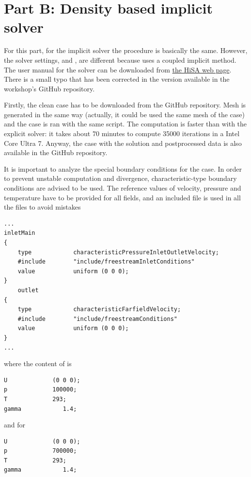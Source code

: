 \documentclass[
    parskip=half,      %
    DIV=12,            %
    headings=normal,   %
    fontsize=11pt,     %
    english            %
]{scrartcl}
\begin{document}
\section{Part B: Density based implicit solver }

For this part, for the implicit solver  the procedure is basically the same.
However, the solver settings,  and ,
are different because  uses a coupled implicit method. The user manual
for the solver can be downloaded from \href{https://hisa.gitlab.io/downloads/userManual.pdf}{the HiSA web page}. 
There is a small typo that has been 
corrected in the version available in the workshop's GitHub repository.

Firstly, the clean case has to be downloaded from the GitHub repository. Mesh is generated in the same way (actually, it could be used the same mesh of the  case) and the 
case is ran with the same script. The computation is faster than with the explicit solver: it takes about 70 minutes to compute 35000 iterations in a Intel Core Ultra 7. Anyway, the case with the solution and
postprocessed data is also available in the GitHub repository.

It is important to analyze the special boundary conditions for the  case. In
order to prevent unstable computation and divergence, characteristic-type boundary conditions
are advised to be used. The reference values of velocity, pressure and temperature have to be
provided for all fields, and an included file is used in all the files to avoid mistakes

\begin{lstlisting}[style=openfoam]
...
inletMain
{
	type            characteristicPressureInletOutletVelocity;
	#include        "include/freestreamInletConditions"
	value           uniform (0 0 0);
}
    outlet
{
	type            characteristicFarfieldVelocity;
	#include        "include/freestreamConditions"
	value           uniform (0 0 0);
}
...
\end{lstlisting}

where the content of  is

\begin{lstlisting}[style=openfoam]
U             (0 0 0);
p             100000;
T             293;
gamma            1.4;
\end{lstlisting}
and for 
 \begin{lstlisting}[style=openfoam]
U             (0 0 0);
p             700000;
T             293;
gamma            1.4;
 \end{lstlisting}
 
\end{document}
